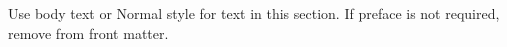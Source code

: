 
Use body text or Normal style for text in this section.
If preface is not required, remove from front matter.
